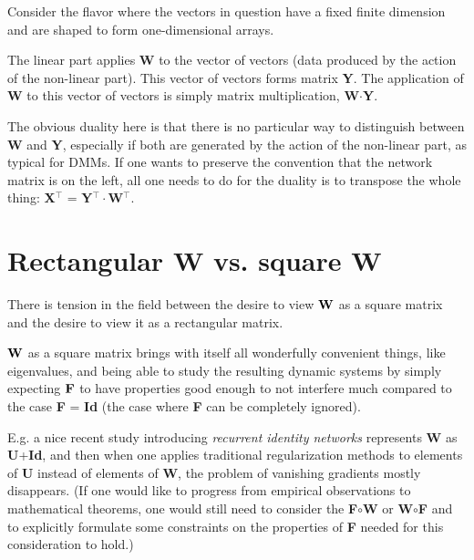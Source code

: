 \documentclass{article}
\begin{document}
\bigskip

Consider the flavor where the vectors in question have a fixed finite dimension and are shaped to form one-dimensional arrays.

\smallskip

The linear part applies {\bf W} to the vector of vectors (data produced by the action of the non-linear part). This vector of vectors forms matrix {\bf Y}. The application of {\bf W} to this vector of vectors is simply matrix multiplication, {\bf W}$\cdot${\bf Y}.

\bigskip

The obvious duality here is that there is no particular way to distinguish between {\bf W} and {\bf Y}, especially if both are
generated by the action of the non-linear part, as typical for DMMs. If one wants to preserve the convention that the network matrix is on the left, all one needs to do for the duality is to transpose the whole thing: {\bf X}$^{\top}$ = {\bf Y}$^{\top}\cdot${\bf W}$^{\top}$.

\section{Rectangular {\bf W} vs. square {\bf W}}


There is tension in the field between the desire to view $\bf W$ as a square matrix and the desire to view it as a rectangular matrix.

\bigskip

$\bf W$ as a square matrix brings with itself all wonderfully convenient things,
like eigenvalues, and being able
to study the resulting dynamic systems by simply expecting $\bf F$ to have properties good enough to not interfere much compared to the case {\bf F} = {\bf Id} 
(the case where {\bf F} can be completely ignored).

\smallskip

E.g. a nice recent study introducing {\em recurrent identity networks} represents {\bf W} as {\bf U}+{\bf Id}, and then when one applies traditional
regularization methods to elements of {\bf U} instead of elements of {\bf W}, the problem of vanishing gradients mostly disappears. (If one would like to progress from empirical observations to mathematical theorems, one would still need to consider the {\bf F}$\circ${\bf W} or {\bf W}$\circ${\bf F} and to explicitly formulate some constraints on the properties of {\bf F} needed for this consideration to hold.)
\end{document}
